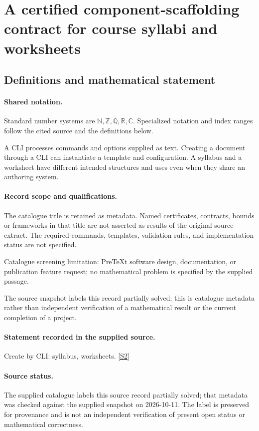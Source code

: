 \documentclass[11pt]{article}
\newcommand{\sref}[2]{\hyperlink{source:#1:#2}{[S#2]}}
\begin{document}
\section{A certified component-scaffolding contract for course syllabi and worksheets}\label{statement}

\subsection{Definitions and mathematical statement}

\paragraph{Shared notation.}Standard number systems are $\mathbb N,\mathbb Z,\mathbb Q,\mathbb R,\mathbb C$. Specialized notation and index ranges follow the cited source and the definitions below.


A CLI processes commands and options supplied as text. Creating a document through a CLI can instantiate a template and configuration. A syllabus and a worksheet have different intended structures and uses even when they share an authoring system.
\paragraph{Record scope and qualifications.}
The catalogue title is retained as metadata. Named certificates, contracts, bounds or frameworks in that title are not asserted as results of the original source extract.
The required commands, templates, validation rules, and implementation status are not specified.

Catalogue screening limitation: PreTeXt software design, documentation, or publication feature request; no mathematical problem is specified by the supplied passage.

The source snapshot labels this record partially solved; this is catalogue metadata rather than independent verification of a mathematical result or the current completion of a project.
\paragraph{Statement recorded in the supplied source.}
Create by CLI: syllabus, worksheets. \sref{statement}{2}
\paragraph{Source status.}
The supplied catalogue labels this source record partially solved; that metadata was checked against the supplied snapshot on 2026-10-11. The label is preserved for provenance and is not an independent verification of present open status or mathematical correctness.
\end{document}
